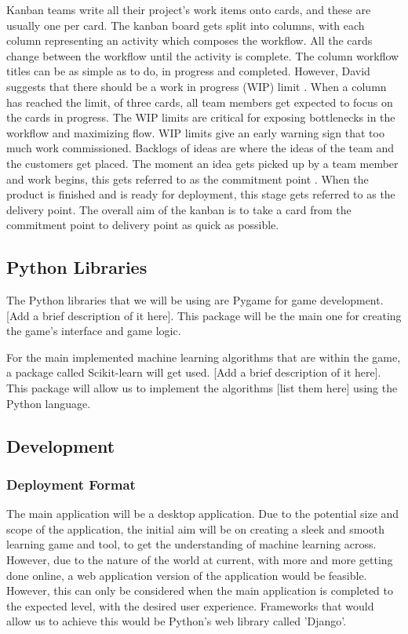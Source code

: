 \documentclass[a4paper,10pt]{article}
\begin{document}
Kanban teams write all their project's work items onto cards, and these are usually one per card. The kanban board gets split into columns, with each column representing an activity which composes the workflow. All the cards change between the workflow until the activity is complete. The column workflow titles can be as simple as to do, in progress and completed. However, David suggests that there should be a work in progress (WIP) limit \cite{anderson2010kanban}. When a column has reached the limit, of three cards, all team members get expected to focus on the cards in progress. The WIP limits are critical for exposing bottlenecks in the workflow and maximizing flow. WIP limits give an early warning sign that too much work commissioned. Backlogs of ideas are where the ideas of the team and the customers get placed. The moment an idea gets picked up by a team member and work begins, this gets referred to as the commitment point \cite{anderson2010kanban}. When the product is finished and is ready for deployment, this stage gets referred to as the delivery point. The overall aim of the kanban is to take a card from the commitment point to delivery point as quick as possible.  

\subsection{Python Libraries} %
The Python libraries that we will be using are Pygame for game development. [Add a brief description of it here]. This package will be the main one for creating the game's interface and game logic. 

For the main implemented machine learning algorithms that are within the game, a package called Scikit-learn will get used. [Add a brief description of it here]. This package will allow us to implement the algorithms [list them here] using the Python language.

\subsection{Development}
\subsubsection{Deployment Format}
The main application will be a desktop application.  Due to the potential size and scope of the application, the initial aim will be on creating a sleek and smooth learning game and tool, to get the understanding of machine learning across. However, due to the nature of the world at current, with more and more getting done online, a web application version of the application would be feasible. However, this can only be considered when the main application is completed to the expected level, with the desired user experience. Frameworks that would allow us to achieve this would be Python's web library called 'Django'.
\end{document}
